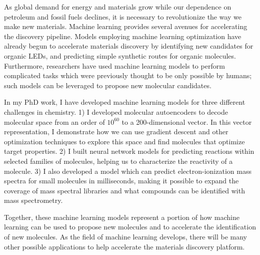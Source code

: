 
As global demand for energy and materials grow while our dependence on petroleum and fossil fuels declines, it is necessary to revolutionize the way we make new materials. 
Machine learning provides several avenues for accelerating the discovery pipeline.
Models employing machine learning optimization have already begun to accelerate materials discovery by identifying new candidates for organic LEDs, and predicting simple synthetic routes for organic molecules. 
Furthermore, researchers have used machine learning models to perform complicated tasks which were previously thought to be only possible by humans; such models can be leveraged to propose new molecular candidates. 

In my PhD work, I have developed machine learning models for three different challenges in chemistry. 
1) I developed molecular autoencoders to decode molecular space from an order of $10^{60}$ to a 200-dimensional vector. In this vector representation, I demonstrate how we can use gradient descent and other optimization techniques to explore this space and find molecules that optimize target properties. 
2) I built neural network models for predicting reactions within selected families of molecules, helping us to characterize the reactivity of a molecule. 
3) I also developed a model which can predict electron-ionization mass spectra for small molecules in milliseconds, making it possible to expand the coverage of mass spectral libraries and what compounds can be identified with mass spectrometry. 

Together, these machine learning models represent a portion of how machine learning can be used to propose new molecules and to accelerate the identification of new molecules. As the field of machine learning develops, there will be many other possible applications to help accelerate the materials discovery platform.
